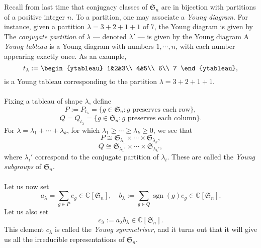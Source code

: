 \documentclass[a4paper]{report}
\theoremstyle{definition}
\theoremstyle{remark}
\theoremstyle{proposition}
\theoremstyle{conjecture}
\theoremstyle{lemma}
\theoremstyle{corollary}
\theoremstyle{exercise}
\theoremstyle{example}
\newcommand{\C}{\mathbb{C}}
\newcommand{\on}{\operatorname}
\begin{document}
Recall from last time that conjugacy classes of $\mathfrak{S}_n$ 
are in bijection with partitions of a positive integer $n$.
To a partition, one may associate a \emph{Young diagram}.
For instance, given a partition $\lambda = 3+2+1+1$ of $7$, 
the Young diagram is given by 
The \emph{conjugate partition} of $\lambda$ --- denoted $\lambda'$ --- is given by the Young diagram
A \emph{Young tableau} is a Young diagram with numbers $1,\cdots,n$,
with each number appearing exactly once. 
As an example, 
$$t_\lambda := \begin{ytableau}
    1&2&3\\
    4&5\\
    6\\
    7
\end{ytableau},$$
is a Young tableau corresponding to the partition 
$\lambda = 3+2+1+1$.\\\\
Fixing a tableau of shape $\lambda$, define 
$$P := P_{t_\lambda} = \lbrace g\in \mathfrak{S}_n : \text{$g$ preserves each row}\rbrace,$$
$$Q = Q_{t_\lambda} = \lbrace g\in \mathfrak{S}_n : \text{$g$ preserves each column}\rbrace.$$
For $\lambda = \lambda_1 + \cdots + \lambda_k$, for which 
$\lambda_1 \geq \cdots \geq \lambda_k \geq 0$, we see that 
$$P \cong \mathfrak{S}_{\lambda_1}\times\cdots \times \mathfrak{S}_{\lambda_k},$$
$$Q \cong \mathfrak{S}_{\lambda_1'} \times \cdots\times \mathfrak{S}_{\lambda_k'},$$
where $\lambda_i'$ correspond to the conjugate partition of $\lambda_i$.
These are called the \emph{Young subgroups} of $\mathfrak{S}_n$.\\\\
Let us now set 
$$a_\lambda = \sum_{g\in P} e_g \in \C[\mathfrak{S}_n],\quad b_\lambda := \sum_{g \in Q} \on{sgn}(g)e_g \in \C[\mathfrak{S}_n].$$
Let us also set 
$$c_\lambda := a_\lambda b_\lambda \in \C[\mathfrak{S}_n].$$
This element $c_\lambda$ is called the \emph{Young symmetriser}, and it turns out that 
it will give us all the irreducible representations of $\mathfrak{S}_n$.
\end{document}
